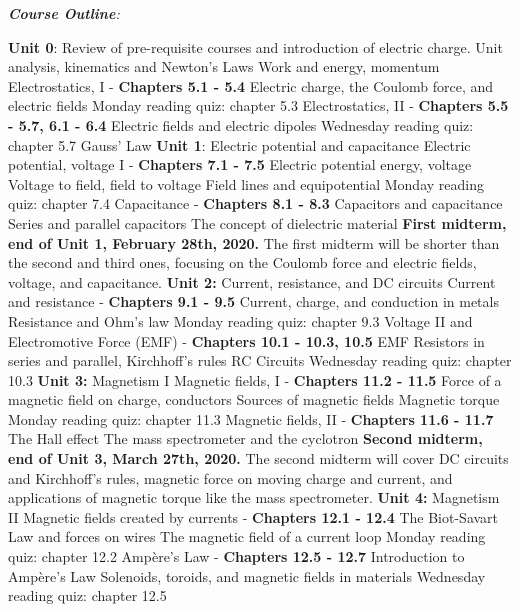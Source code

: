 \documentclass[10pt]{article}
\begin{document}
\clearpage
\small
\textit{\textbf{Course Outline}:}
\begin{outline}[enumerate]
\1 \textbf{Unit 0}: Review of pre-requisite courses and introduction of electric charge.
\2 Unit analysis, kinematics and Newton's Laws
\2 Work and energy, momentum
\2 Electrostatics, I - \textbf{Chapters 5.1 - 5.4}
\3 Electric charge, the Coulomb force, and electric fields
\3 Monday reading quiz: chapter 5.3
\2 Electrostatics, II - \textbf{Chapters 5.5 - 5.7, 6.1 - 6.4}
\3 Electric fields and electric dipoles
\3 Wednesday reading quiz: chapter 5.7
\3 Gauss' Law
\1 \textbf{Unit 1}: Electric potential and capacitance
\2 Electric potential, voltage I - \textbf{Chapters 7.1 - 7.5}
\3 Electric potential energy, voltage
\3 Voltage to field, field to voltage
\3 Field lines and equipotential
\3 Monday reading quiz: chapter 7.4
\2 Capacitance - \textbf{Chapters 8.1 - 8.3}
\3 Capacitors and capacitance
\3 Series and parallel capacitors
\3 The concept of dielectric material
\1 \textbf{First midterm, end of Unit 1, February 28th, 2020.} The first midterm will be shorter than the second and third ones, focusing on the Coulomb force and electric fields, voltage, and capacitance.
\1 \textbf{Unit 2:} Current, resistance, and DC circuits
\2 Current and resistance - \textbf{Chapters 9.1 - 9.5}
\3 Current, charge, and conduction in metals
\3 Resistance and Ohm's law
\3 Monday reading quiz: chapter 9.3
\2 Voltage II and Electromotive Force (EMF) - \textbf{Chapters 10.1 - 10.3, 10.5}
\3 EMF
\3 Resistors in series and parallel, Kirchhoff's rules
\3 RC Circuits
\3 Wednesday reading quiz: chapter 10.3
\1 \textbf{Unit 3:} Magnetism I
\2 Magnetic fields, I - \textbf{Chapters 11.2 - 11.5}
\3 Force of a magnetic field on charge, conductors
\3 Sources of magnetic fields
\3 Magnetic torque
\3 Monday reading quiz: chapter 11.3
\2 Magnetic fields, II - \textbf{Chapters 11.6 - 11.7}
\3 The Hall effect
\3 The mass spectrometer and the cyclotron
\1 \textbf{Second midterm, end of Unit 3, March 27th, 2020.} The second midterm will cover DC circuits and Kirchhoff's rules, magnetic force on moving charge and current, and applications of magnetic torque like the mass spectrometer.
\1 \textbf{Unit 4:} Magnetism II
\2 Magnetic fields created by currents - \textbf{Chapters 12.1 - 12.4}
\3 The Biot-Savart Law and forces on wires
\3 The magnetic field of a current loop
\3 Monday reading quiz: chapter 12.2
\2 Amp\`{e}re's Law - \textbf{Chapters 12.5 - 12.7}
\3 Introduction to Amp\`{e}re's Law
\3 Solenoids, toroids, and magnetic fields in materials
\3 Wednesday reading quiz: chapter 12.5

\end{outline}
\end{document}
